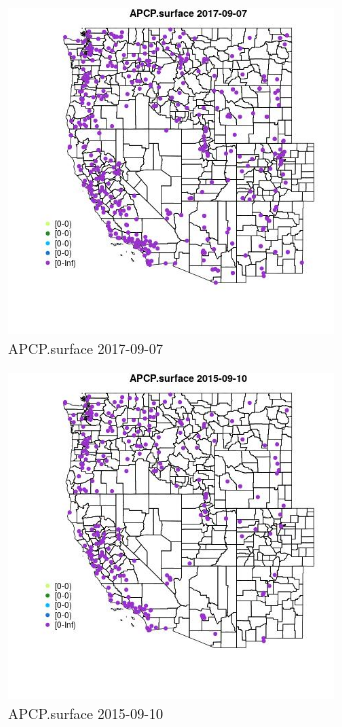 \begin{figure} 
\centering  
\includegraphics[width=0.77\textwidth]{Code_Outputs/Report_ML_input_PM25_Step4_part_e_de_duplicated_aves_compiled_2019-05-21wNAs_MapObsAPCPsurface2017-09-07.jpg} 
\caption{\label{fig:Report_ML_input_PM25_Step4_part_e_de_duplicated_aves_compiled_2019-05-21wNAsMapObsAPCPsurface2017-09-07}APCP.surface 2017-09-07} 
\end{figure} 
 

\clearpage 

\begin{figure} 
\centering  
\includegraphics[width=0.77\textwidth]{Code_Outputs/Report_ML_input_PM25_Step4_part_e_de_duplicated_aves_compiled_2019-05-21wNAs_MapObsAPCPsurface2015-09-10.jpg} 
\caption{\label{fig:Report_ML_input_PM25_Step4_part_e_de_duplicated_aves_compiled_2019-05-21wNAsMapObsAPCPsurface2015-09-10}APCP.surface 2015-09-10} 
\end{figure} 
 

